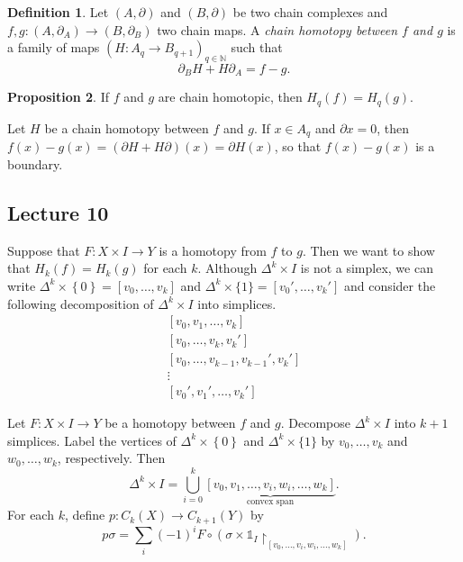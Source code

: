 \documentclass[10pt,letterpaper,cm]{nupset}
\theoremstyle{definition}
\newtheorem{definition}{Definition}[subsection]
\theoremstyle{theorem}
\newtheorem{prop}[definition]{Proposition}
\theoremstyle{remark}
\newcommand{\N}{\mathbb N}
\newcommand{\1}{\mathbb{1}}
\newcommand{\0}{\vec 0}
\begin{document}
\smallskip




\begin{definition}
Let $\left(A, \partial\right)$ and $\left(B, \partial\right)$ be two chain complexes and $f,g : (A, \partial_A) \to (B, \partial_B)$ two chain maps. A \textit{chain homotopy between $f$ and $g$} is a family of maps $\left(H: A_q \to B_{q+1}\right)_{q\in \N}$ such that $$\partial_B H + H\partial_A = f-g.$$
\end{definition}

\begin{prop}
If $f$ and $g$ are chain homotopic, then $H_q(f) = H_q(g)$. 
\end{prop}


Let $H$ be a chain homotopy between $f$ and $g$. If $x\in A_q$ and $\partial{x} = 0$, then $f(x) -g(x) = \left(\partial H + H \partial\right)(x) = \partial H(x)$, so that $f(x) -g(x)$ is a boundary. 



\subsection{Lecture 10}

Suppose that $F : X \times I \to Y$ is a homotopy from $f$ to $g$. Then we want to show that $H_k(f) =H_k(g)$ for each $k$. Although $\Delta^k \times I $ is not a simplex, we can write $\Delta^k \times \left\{0\right\} = \left[v_0, \ldots, v_k\right]$ and $\Delta^k \times  \{1\} = [v_0', \ldots, v_k']$ and consider the following decomposition of  $\Delta^k \times I$ into simplices. 
\begin{gather*}
\left[v_0, v_1,  \ldots, v_k\right]
\\ \left[v_0, \ldots,  v_k, v_k'\right]
\\ \left[v_0, \ldots,  v_{k-1}  , v_{k-1}', v_k'\right]
\\  \vdots
\\ \left[v_0', v_1',  \ldots, v_k'\right]
\end{gather*}

\smallskip

Let $F: X \times I \to Y$ be a homotopy between $f$ and $g$. 
Decompose $\Delta^k \times I$ into $k+1$ simplices. Label the vertices of $\Delta^k \times \left\{0\right\}$ and $\Delta^k \times \{1\}$ by $v_0, \ldots, v_k$ and $w_0, \ldots, w_k$, respectively. Then $$\Delta^k \times I = \bigcup_{i=0}^k \underbrace{[v_0, v_1, \ldots, v_i, w_i, \ldots, w_k]}_{\text{convex span}}.$$
For each $k$, define $p: C_k(X) \to C_{k+1}(Y)$ by $$ p\sigma = \sum_i ({-1})^i F \circ (\sigma \times \1_I \restriction_{[v_0, \ldots, v_i, w_i, \ldots, w_k]}).$$ 
\end{document}
